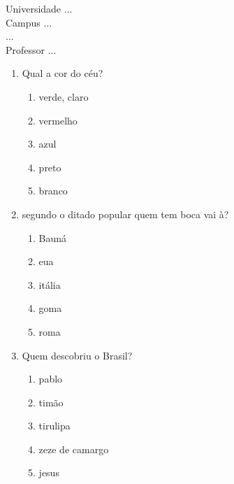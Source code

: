 \documentclass[10pt,a4paper,twocolumn]{report}
\begin{document}
\begin{flushleft}
Universidade ...\\
Campus ...\\
...\\
Professor ...\\
\end{flushleft}




 \begin{enumerate} 
    \item  Qual a cor do céu?





    \begin{enumerate}
    \item  verde, claro

\item  vermelho

\item  azul

\item  preto

\item  branco


    \end{enumerate} 
    \item  segundo o ditado popular quem tem boca vai à?





    \begin{enumerate}
    \item  Bauná

\item  eua

\item  itália

\item  goma

\item  roma


    \end{enumerate} 
    \item  Quem descobriu o Brasil?





    \begin{enumerate}
    \item  pablo

\item  timão

\item  tirulipa

\item  zeze de camargo

\item  jesus


    \end{enumerate}\end{enumerate} 
\end{document}
